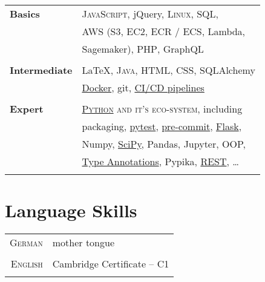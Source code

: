 \documentclass[a4paper,10pt]{article} %
\begin{document}
{\begin{minipage}[t]{0.44\textwidth}
\begin{tabular}{ll}
\textbf{Basics}& \textsc{JavaScript}, jQuery, \textsc{Linux}, \textsc{SQL}, \\
               & AWS (S3, EC2, ECR / ECS, Lambda, \\
               & Sagemaker), \textsc{PHP}, GraphQL\\ \\
\textbf{Intermediate} & \LaTeX, \textsc{Java}, \textsc{HTML}, \textsc{CSS}, SQLAlchemy\\
               & \href{https://martin-thoma.com/docker/}{Docker}, git, \href{https://levelup.gitconnected.com/ci-pipelines-for-python-projects-9ac2830d2e38}{CI/CD pipelines}\\ \\
\textbf{Expert} & \textsc{\href{https://stackoverflow.com/help/badges/51/python?userid=562769}{Python} and it's eco-system}, including\\
               & packaging, \href{https://medium.com/swlh/unit-testing-in-python-basics-21a9a57418a0}{pytest}, \href{https://towardsdatascience.com/pre-commit-hooks-you-must-know-ff247f5feb7e}{pre-commit}, \href{https://medium.com/analytics-vidhya/how-to-test-flask-applications-aef12ae5181c}{Flask},\\
               & Numpy, \href{https://arxiv.org/pdf/1907.10121.pdf}{SciPy}, Pandas, Jupyter, OOP, \\
               & \href{https://medium.com/analytics-vidhya/type-annotations-in-python-3-8-3b401384403d}{Type Annotations}, Pypika, \href{https://martin-thoma.com/rest/}{REST}, \dots\\ \\
\end{tabular}


\section{Language Skills}

\begin{tabular}{rl}
\textsc{German}
& mother tongue\\
& \\
\textsc{English}
& Cambridge Certificate – C1\\
& \\
\end{tabular}\\[10pt]


\end{minipage}}
\end{document}
